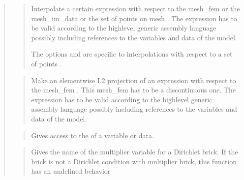 \documentclass[a4paper,11pt,english]{sphinxmanual}
\begin{document}
\begin{quote}
\sphinxAtStartPar
{}
\begin{quote}

\sphinxAtStartPar
Interpolate a certain expression with respect to the mesh\_fem 
or the mesh\_im\_data  or the set of points  on mesh .
The expression has to be valid according to the high\sphinxhyphen{}level generic
assembly language possibly including references to the variables
and data of the model.

\sphinxAtStartPar
The options  and  are specific to
interpolations with respect to a set of points .
\end{quote}

\sphinxAtStartPar
{}
\begin{quote}

\sphinxAtStartPar
Make an elementwise L2 projection of an expression with respect
to the mesh\_fem . This mesh\_fem has to be
a discontinuous one.
The expression has to be valid according to the high\sphinxhyphen{}level generic
assembly language possibly including references to the variables
and data of the model.
\end{quote}

\sphinxAtStartPar
{}
\begin{quote}

\sphinxAtStartPar
Gives access to the  of a variable or data.
\end{quote}

\sphinxAtStartPar
{}
\begin{quote}

\sphinxAtStartPar
Gives the name of the multiplier variable for a Dirichlet brick.
If the brick is not a Dirichlet condition with multiplier brick,
this function has an undefined behavior
\end{quote}


\end{quote}
\end{document}
